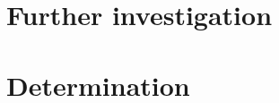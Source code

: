 
\section{Further investigation}
\label{partnering_investigation}

%


\section{Determination}
\label{partnering_determination}

